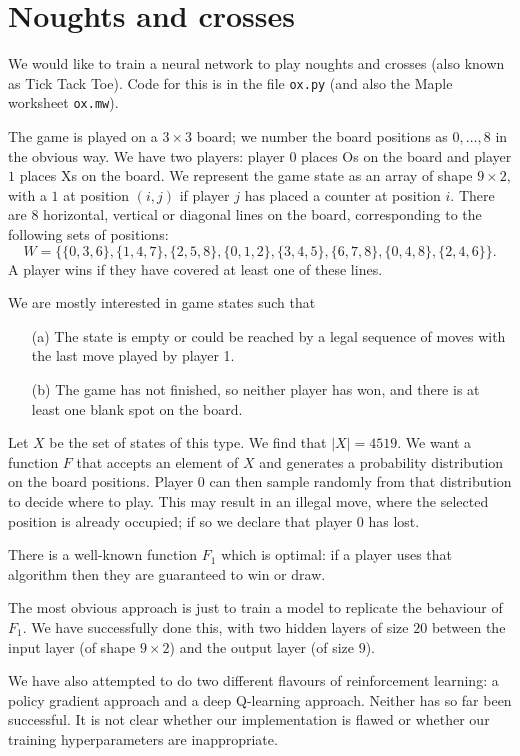 \documentclass{amsart}
\newcommand{\tm}        {\times}
\renewcommand{\:}{\colon}
\theoremstyle{definition}
\begin{document}
\section{Noughts and crosses}

We would like to train a neural network to play noughts and crosses
(also known as Tick Tack Toe).  Code for this is in the file
\texttt{ox.py} (and also the Maple worksheet \texttt{ox.mw}). 

The game is played on a $3\tm 3$ board; we number the board positions
as $0,\dotsc,8$ in the obvious way.  We have two players: player $0$
places Os on the board and player $1$ places Xs on the board.  We
represent the game state as an array of shape $9\tm 2$, with a $1$ at
position $(i,j)$ if player $j$ has placed a counter at position $i$.
There are $8$ horizontal, vertical or diagonal lines on the board,
corresponding to the following sets of positions:
\[ W = \{\{0,3,6\}, \{1,4,7\}, \{2,5,8\}, 
         \{0,1,2\}, \{3,4,5\}, \{6,7,8\},
         \{0,4,8\}, \{2,4,6\}\}.
\]
A player wins if they have covered at least one of these lines.

We are mostly interested in game states such that
\begin{itemize}
 \item[(a)] The state is empty or could be reached by a legal sequence
  of moves with the last move played by player 1.
 \item[(b)] The game has not finished, so neither player has won, and
  there is at least one blank spot on the board.
\end{itemize}
Let $X$ be the set of states of this type.  We find that $|X|=4519$.
We want a function $F$ that accepts an element of $X$ and generates a
probability distribution on the board positions.  Player $0$ can then
sample randomly from that distribution to decide where to play.  This
may result in an illegal move, where the selected position is already
occupied; if so we declare that player $0$ has lost.

There is a well-known function $F_1$ which is optimal: if a player
uses that algorithm then they are guaranteed to win or draw.

The most obvious approach is just to train a model to replicate the
behaviour of $F_1$.  We have successfully done this, with two hidden
layers of size $20$ between the input layer (of shape $9\times 2$) and
the output layer (of size $9$).

We have also attempted to do two different flavours of reinforcement
learning: a policy gradient approach and a deep Q-learning approach.
Neither has so far been successful.  It is not clear whether our
implementation is flawed or whether our training hyperparameters are
inappropriate.
\end{document}
